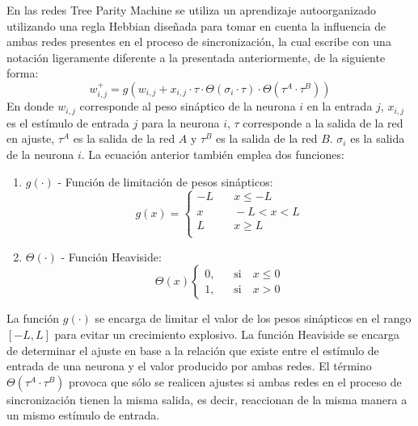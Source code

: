 En las redes Tree Parity Machine se utiliza un aprendizaje autoorganizado utilizando una regla Hebbian diseñada para tomar en cuenta la influencia de ambas redes presentes en el proceso de sincronización, la cual \cite{ruttor_neural_2006} escribe con una notación ligeramente diferente a la presentada anteriormente, de la siguiente forma:
$$ w^{+}_{i,j} = g(w_{i,j} + x_{i,j} \cdot \tau \cdot \Theta(\sigma_{i}\cdot\tau) \cdot \Theta(\tau^A\cdot\tau^B)) $$
En donde $w_{i,j}$ corresponde al peso sináptico de la neurona $i$ en la entrada $j$, $x_{i,j}$ es el estímulo de entrada $j$ para la neurona $i$, $\tau$ corresponde a la salida de la red en ajuste, $\tau^A$ es la salida de la red $A$ y $\tau^B$ es la salida de la red $B$. $\sigma_i$ es la salida de la neurona $i$. La ecuación anterior también emplea dos funciones:
\begin{enumerate}
    \item $g(\cdot)$ - Función de limitación de pesos sinápticos: $$ g(x) = 
    \begin{cases}
    -L &\quad x \le -L \\
    x &\quad -L < x < L \\
    L &\quad x \ge L \\
    \end{cases}$$
    \item $\Theta(\cdot)$ - Función Heaviside: $$ \Theta(x) \begin{cases}
    \text{0,} &\quad\text{si} \quad x \le 0 \\
    \text{1,} &\quad\text{si} \quad x > 0
    \end{cases} $$
\end{enumerate}

La función $g(\cdot)$ se encarga de limitar el valor de los pesos sinápticos en el rango $[-L,L]$ para evitar un crecimiento explosivo. La función Heaviside se encarga de determinar el ajuste en base a la relación que existe entre el estímulo de entrada de una neurona y el valor producido por ambas redes. El término $\Theta(\tau^A\cdot\tau^B)$ provoca que sólo se realicen ajustes si ambas redes en el proceso de sincronización tienen la misma salida,  es decir, reaccionan de la misma manera a un mismo estímulo de entrada.